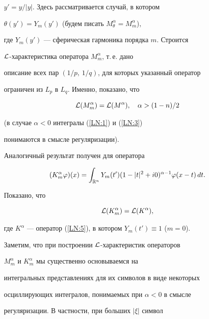 $y'=y/|y|$. Здесь рассматривается случай, в котором


$\theta(y')=Y_m(y')$ (будем писать $M_\theta^\alpha=M_m^\alpha$),


где $Y_m(y')$ --- сферическая гармоника порядка $m$. Строится


$\cal L$-характеристика оператора $M_m^\alpha$, т.\,е. дано


описание всех пар $(1/p,\ 1/q)$, для которых указанный оператор


ограничен из $L_p$ в $L_q$. Именно, показано, что


\begin{equation}\label{LN:4}


{\cal L}(M_m^\alpha)= {\cal L}(M^\alpha), \quad \alpha>(1-n)/2


\end{equation}


(в случае $\alpha<0$ интегралы (\ref{LN:1}) и (\ref{LN:3})


понимаются в смысле регуляризации).


Аналогичный результат получен для оператора


\begin{equation}\label{LN:5}


(K_m^\alpha \varphi)(x)= \int_{\Bbb R^n} Y_m(t')


(1-|t|^2+i0)^{\alpha-1} \varphi(x-t)\,dt.


\end{equation}


Показано, что


\begin{equation}\label{LN:6}


{\cal L}(K_m^\alpha)= {\cal L}(K^\alpha),


\end{equation}


где $K^\alpha$ --- оператор (\ref{LN:5}), в котором $Y_m(t')\equiv


1$ ($m=0$).





Заметим, что при построении $\cal L$-характеристик операторов


$M_m^\alpha$ и $K_m^\alpha$ мы существенно основываемся на


интегральных представлениях для их символов в виде некоторых


осциллирующих интегралов, понимаемых при $\alpha<0$ в смысле


регуляризации. В частности, при больших $|\xi|$ символ


